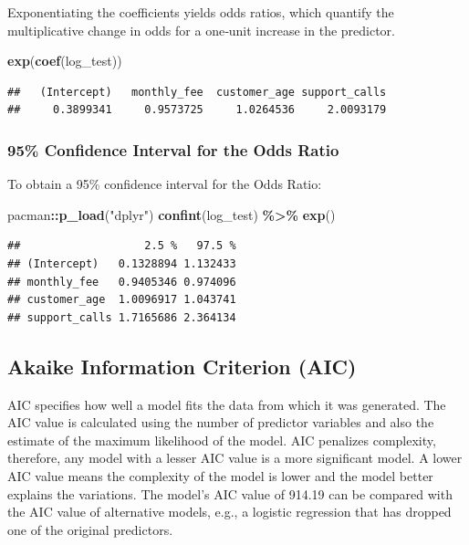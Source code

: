 \documentclass[
]{article}
\newenvironment{Shaded}{\begin{snugshade}}{\end{snugshade}}
\newcommand{\FunctionTok}[1]{\textcolor[rgb]{0.13,0.29,0.53}{\textbf{#1}}}
\newcommand{\NormalTok}[1]{#1}
\newcommand{\SpecialCharTok}[1]{\textcolor[rgb]{0.81,0.36,0.00}{\textbf{#1}}}
\newcommand{\StringTok}[1]{\textcolor[rgb]{0.31,0.60,0.02}{#1}}
\begin{document}
Exponentiating the coefficients yields odds ratios, which quantify the
multiplicative change in odds for a one‑unit increase in the predictor.

\begin{Shaded}
\begin{Highlighting}[]
\FunctionTok{exp}\NormalTok{(}\FunctionTok{coef}\NormalTok{(log\_test))}
\end{Highlighting}
\end{Shaded}

\begin{verbatim}
##   (Intercept)   monthly_fee  customer_age support_calls 
##     0.3899341     0.9573725     1.0264536     2.0093179
\end{verbatim}

\subsubsection{95\% Confidence Interval for the Odds
Ratio}\label{confidence-interval-for-the-odds-ratio}

To obtain a 95\% confidence interval for the Odds Ratio:

\begin{Shaded}
\begin{Highlighting}[]
\NormalTok{pacman}\SpecialCharTok{::}\FunctionTok{p\_load}\NormalTok{(}\StringTok{"dplyr"}\NormalTok{)}
\FunctionTok{confint}\NormalTok{(log\_test) }\SpecialCharTok{\%\textgreater{}\%} \FunctionTok{exp}\NormalTok{()}
\end{Highlighting}
\end{Shaded}

\begin{verbatim}
##                   2.5 %   97.5 %
## (Intercept)   0.1328894 1.132433
## monthly_fee   0.9405346 0.974096
## customer_age  1.0096917 1.043741
## support_calls 1.7165686 2.364134
\end{verbatim}

\subsection{Akaike Information Criterion
(AIC)}\label{akaike-information-criterion-aic}

AIC specifies how well a model fits the data from which it was
generated. The AIC value is calculated using the number of predictor
variables and also the estimate of the maximum likelihood of the model.
AIC penalizes complexity, therefore, any model with a lesser AIC value
is a more significant model. A lower AIC value means the complexity of
the model is lower and the model better explains the variations. The
model's AIC value of 914.19 can be compared with the AIC value of
alternative models, e.g., a logistic regression that has dropped one of
the original predictors.
\end{document}
